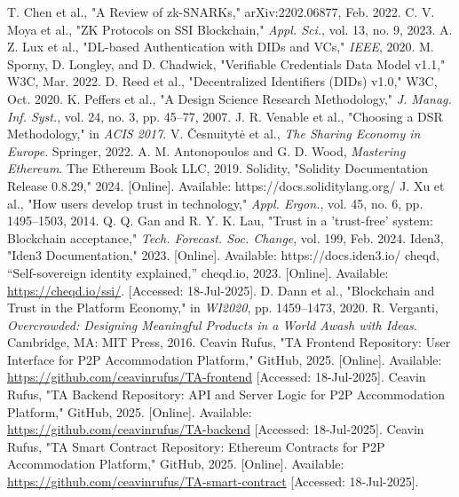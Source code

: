 \documentclass[conference]{IEEEtran}
\begin{document}
\begin{thebibliography}{99}
 T. Chen et al., "A Review of zk-SNARKs," arXiv:2202.06877, Feb. 2022.
 C. V. Moya et al., "ZK Protocols on SSI Blockchain," \textit{Appl. Sci.}, vol. 13, no. 9, 2023.
 A. Z. Lux et al., "DL-based Authentication with DIDs and VCs," \textit{IEEE}, 2020.
 M. Sporny, D. Longley, and D. Chadwick, "Verifiable Credentials Data Model v1.1," W3C, Mar. 2022.
 D. Reed et al., "Decentralized Identifiers (DIDs) v1.0," W3C, Oct. 2020.
 K. Peffers et al., "A Design Science Research Methodology," \textit{J. Manag. Inf. Syst.}, vol. 24, no. 3, pp. 45–77, 2007.
 J. R. Venable et al., "Choosing a DSR Methodology," in \textit{ACIS 2017}.
 V. Česnuitytė et al., \textit{The Sharing Economy in Europe}. Springer, 2022.
 A. M. Antonopoulos and G. D. Wood, \textit{Mastering Ethereum}. The Ethereum Book LLC, 2019.
 Solidity, "Solidity Documentation Release 0.8.29," 2024. [Online]. Available: https://docs.soliditylang.org/
 J. Xu et al., "How users develop trust in technology," \textit{Appl. Ergon.}, vol. 45, no. 6, pp. 1495–1503, 2014.
 Q. Q. Gan and R. Y. K. Lau, "Trust in a 'trust-free' system: Blockchain acceptance," \textit{Tech. Forecast. Soc. Change}, vol. 199, Feb. 2024.
 Iden3, "Iden3 Documentation," 2023. [Online]. Available: https://docs.iden3.io/
 cheqd, ``Self-sovereign identity explained,'' cheqd.io, 2023. [Online]. Available: \url{https://cheqd.io/ssi/}. [Accessed: 18-Jul-2025].
 D. Dann et al., "Blockchain and Trust in the Platform Economy," in \textit{WI2020}, pp. 1459–1473, 2020.
 R. Verganti, \textit{Overcrowded: Designing Meaningful Products in a World Awash with Ideas}. Cambridge, MA: MIT Press, 2016.
 Ceavin Rufus, "TA Frontend Repository: User Interface for P2P Accommodation Platform," GitHub, 2025. [Online]. Available: \url{https://github.com/ceavinrufus/TA-frontend} [Accessed: 18-Jul-2025].
 Ceavin Rufus, "TA Backend Repository: API and Server Logic for P2P Accommodation Platform," GitHub, 2025. [Online]. Available: \url{https://github.com/ceavinrufus/TA-backend} [Accessed: 18-Jul-2025].
 Ceavin Rufus, "TA Smart Contract Repository: Ethereum Contracts for P2P Accommodation Platform," GitHub, 2025. [Online]. Available: \url{https://github.com/ceavinrufus/TA-smart-contract} [Accessed: 18-Jul-2025].
\end{thebibliography}
\end{document}
